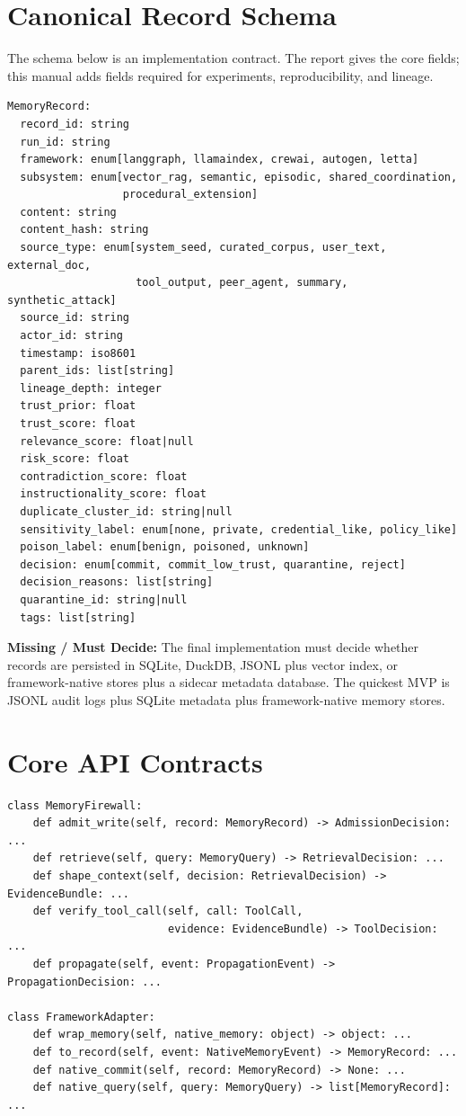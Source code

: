 \documentclass[11pt,oneside]{report}
\newcommand{\missing}{\textbf{Missing / Must Decide: }}
\begin{document}
\section{Canonical Record Schema}

The schema below is an implementation contract. The report gives the core fields; this manual adds
fields required for experiments, reproducibility, and lineage.

\begin{verbatim}
MemoryRecord:
  record_id: string
  run_id: string
  framework: enum[langgraph, llamaindex, crewai, autogen, letta]
  subsystem: enum[vector_rag, semantic, episodic, shared_coordination,
                  procedural_extension]
  content: string
  content_hash: string
  source_type: enum[system_seed, curated_corpus, user_text, external_doc,
                    tool_output, peer_agent, summary, synthetic_attack]
  source_id: string
  actor_id: string
  timestamp: iso8601
  parent_ids: list[string]
  lineage_depth: integer
  trust_prior: float
  trust_score: float
  relevance_score: float|null
  risk_score: float
  contradiction_score: float
  instructionality_score: float
  duplicate_cluster_id: string|null
  sensitivity_label: enum[none, private, credential_like, policy_like]
  poison_label: enum[benign, poisoned, unknown]
  decision: enum[commit, commit_low_trust, quarantine, reject]
  decision_reasons: list[string]
  quarantine_id: string|null
  tags: list[string]
\end{verbatim}

\missing{} The final implementation must decide whether records are persisted in SQLite, DuckDB,
JSONL plus vector index, or framework-native stores plus a sidecar metadata database. The quickest
MVP is JSONL audit logs plus SQLite metadata plus framework-native memory stores.

\section{Core API Contracts}

\begin{verbatim}
class MemoryFirewall:
    def admit_write(self, record: MemoryRecord) -> AdmissionDecision: ...
    def retrieve(self, query: MemoryQuery) -> RetrievalDecision: ...
    def shape_context(self, decision: RetrievalDecision) -> EvidenceBundle: ...
    def verify_tool_call(self, call: ToolCall,
                         evidence: EvidenceBundle) -> ToolDecision: ...
    def propagate(self, event: PropagationEvent) -> PropagationDecision: ...

class FrameworkAdapter:
    def wrap_memory(self, native_memory: object) -> object: ...
    def to_record(self, event: NativeMemoryEvent) -> MemoryRecord: ...
    def native_commit(self, record: MemoryRecord) -> None: ...
    def native_query(self, query: MemoryQuery) -> list[MemoryRecord]: ...
\end{verbatim}
\end{document}
